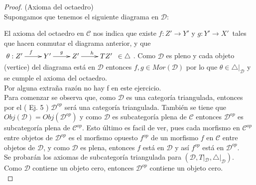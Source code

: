 \documentclass{article}
\begin{document}
\begin{enumerate}[label=\textbf{Ej \arabic*.}]
\begin{proof}
			 (Axioma del octaedro)\\
			Supongamos que tenemos el siguiente diagrama en $\mathscr{D}$:\\
			\centerline{
			} 
			El axioma del octaedro en $\mathscr{C}$ nos indica que existe $f:Z'\to Y'$ y $g:Y'\to X'$ \,tales que hacen conmutar el diagrama anterior, y que\\
			$\xymatrix{\theta:Z'\ar[r]^f&Y'\ar[r]^g&Z'\ar[r]^{h\quad}&TZ' \,\,\, \in \triangle}$. Como $\mathscr{D}$ es pleno y cada objeto (vertice) 
			del diagrama está en 
			$\mathscr{D}$ entonces $f,g\in Mor(\mathscr{D})$ por lo que $\theta\in  \triangle|_{\mathscr{D}}$ y se cumple el axioma del octaedro.\\
			
			 Por alguna extraña razón no hay f en este ejercicio.\\
			
			 Para comenzar se observa que, como $\mathscr{D}$ es una categoría triangulada, entonces por el ( Ej. 5 )  $\mathscr{D}^{op}$ 
			será una categoría triangulada. También se tiene que $Obj(\mathscr{D})=Obj(\mathscr{D}^{op})$ y como $\mathscr{D}$ es subcategoría plena de 
			$\mathscr{C}$ entonces $\mathscr{D}^{op}$ es subcategoría plena de $\mathscr{C}^{op}$. Esto último es facil de ver, pues cada morfismo en 
			$\mathscr{C}^{op}$ entre objetos de $\mathscr{D}^{op}$ es el morfismo opuesto $f^{op}$ de un morfismo $f$ en $\mathscr{C}$ entre objetos de
			$\mathscr{D}$, y como $\mathscr{D}$ es plena, entonces $f$ está en $\mathscr{D}$ y así $f^{op}$ está en $\mathscr{D}^{op}$.\\
			
			Se probarán los axiomas de subcategoría triangulada para $(\mathscr{D},T|_\mathscr{D},\triangle|_\mathscr{D})$.\\
			
			 Como $\mathscr{D}$ contiene un objeto cero, entonces $\mathscr{D}^{op}$ contiene un objeto cero.\\
			

\end{proof}
\end{enumerate}
\end{document}
